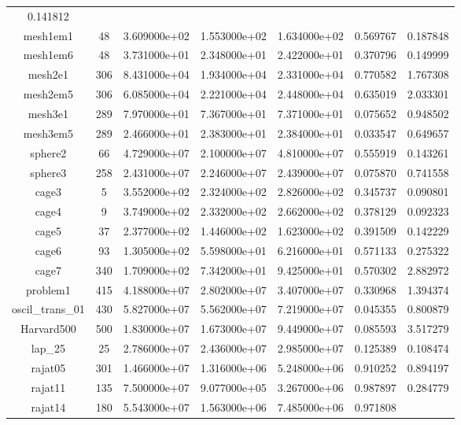\begin{table}[h]
\begin{tabular}{ccccccc}
    0.141812\\
    mesh1em1 & 48 & 3.609000e+02 & 1.553000e+02 & 1.634000e+02 & 0.569767 &
    0.187848\\
    mesh1em6 & 48 & 3.731000e+01 & 2.348000e+01 & 2.422000e+01 & 0.370796 &
    0.149999\\
    mesh2e1 & 306 & 8.431000e+04 & 1.934000e+04 & 2.331000e+04 & 0.770582 &
    1.767308\\
    mesh2em5 & 306 & 6.085000e+04 & 2.221000e+04 & 2.448000e+04 & 0.635019 &
    2.033301\\
    mesh3e1 & 289 & 7.970000e+01 & 7.367000e+01 & 7.371000e+01 & 0.075652 &
    0.948502\\
    mesh3em5 & 289 & 2.466000e+01 & 2.383000e+01 & 2.384000e+01 & 0.033547 &
    0.649657\\
    sphere2 & 66 & 4.729000e+07 & 2.100000e+07 & 4.810000e+07 & 0.555919 &
    0.143261\\
    sphere3 & 258 & 2.431000e+07 & 2.246000e+07 & 2.439000e+07 & 0.075870 &
    0.741558\\
    cage3 & 5 & 3.552000e+02 & 2.324000e+02 & 2.826000e+02 & 0.345737 &
    0.090801\\
    cage4 & 9 & 3.749000e+02 & 2.332000e+02 & 2.662000e+02 & 0.378129 &
    0.092323\\
    cage5 & 37 & 2.377000e+02 & 1.446000e+02 & 1.623000e+02 & 0.391509 &
    0.142229\\
    cage6 & 93 & 1.305000e+02 & 5.598000e+01 & 6.216000e+01 & 0.571133 &
    0.275322\\
    cage7 & 340 & 1.709000e+02 & 7.342000e+01 & 9.425000e+01 & 0.570302 &
    2.882972\\
    problem1 & 415 & 4.188000e+07 & 2.802000e+07 & 3.407000e+07 & 0.330968 &
    1.394374\\
    oscil\_trans\_01 & 430 & 5.827000e+07 & 5.562000e+07 & 7.219000e+07 &
    0.045355 & 0.800879\\
    Harvard500 & 500 & 1.830000e+07 & 1.673000e+07 & 9.449000e+07 & 0.085593 &
    3.517279\\
    lap\_25 & 25 & 2.786000e+07 & 2.436000e+07 & 2.985000e+07 & 0.125389 &
    0.108474\\
    rajat05 & 301 & 1.466000e+07 & 1.316000e+06 & 5.248000e+06 & 0.910252 &
    0.894197\\
    rajat11 & 135 & 7.500000e+07 & 9.077000e+05 & 3.267000e+06 & 0.987897 &
    0.284779\\
    rajat14 & 180 & 5.543000e+07 & 1.563000e+06 & 7.485000e+06 & 0.971808 &

\end{tabular}
\end{table}
